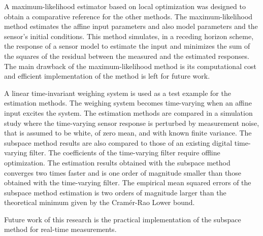 A maximum-likelihood estimator based on local optimization was designed to obtain a comparative reference for the other methods.
The maximum-likelihood method estimates the affine input parameters and also model parameters and the sensor's initial conditions.
This method simulates, in a receding horizon scheme, the response of a sensor model to estimate the input and minimizes the sum of the squares of the residual between the measured and the estimated responses.
The main drawback of the maximum-likelihood method is its computational cost and efficient implementation of the method is left for future work.

A linear time-invariant weighing system is used as a test example for the estimation methods.
The weighing system becomes time-varying when an affine input excites the system.
The estimation methods are compared in a simulation study where the time-varying sensor response is perturbed by measurement noise, that is assumed to be white, of zero mean, and with known finite variance.
The subspace method results are also compared to those of an existing digital time-varying filter.
The coefficients of the time-varying filter require offline optimization.
The estimation results obtained with the subspace method converges two times faster and is one order of magnitude smaller than those obtained with the time-varying filter.
The empirical mean squared errors of the subspace method estimation is two orders of magnitude larger than the theoretical minimum given by the Cram\'er-Rao Lower bound.

Future work of this research is the practical implementation of the subspace method for real-time measurements.

